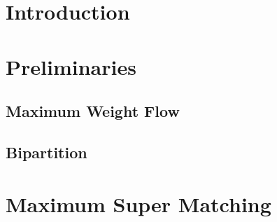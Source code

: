 \begin{abstract}

\end{abstract}

\section{Introduction}


\section{Preliminaries}
\subsection{Maximum Weight Flow}

\subsection{Bipartition}


\section{\FIXEDCARPOOL{}}


\section{\UWCARPOOL{}}


\section{\UCCARPOOL{}}


\section{Maximum Super Matching}


\section{\CARPOOL{}}
